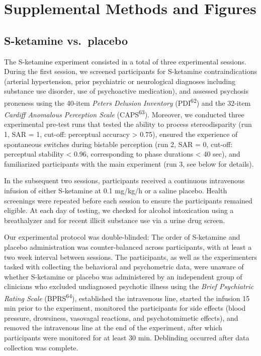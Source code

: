 \documentclass[
]{article}
\begin{document}
\section{Supplemental Methods and
Figures}\label{supplemental-methods-and-figures}

\subsection{S-ketamine vs.~placebo}\label{s-ketamine-vs.-placebo}

The S-ketamine experiment consisted in a total of three experimental
sessions. During the first session, we screened participants for
S-ketamine contraindications (arterial hypertension, prior psychiatric
or neurological diagnoses including substance use disorder, use of
psychoactive medication), and assessed psychosis proneness using the
40-item \emph{Peters Delusion Inventory} (PDI\textsuperscript{62}) and
the 32-item \emph{Cardiff Anomalous Perception Scale}
(CAPS\textsuperscript{63}). Moreover, we conducted three experimental
pre-test runs that tested the ability to process stereodisparity (run 1,
SAR = 1, cut-off: perceptual accuracy \textgreater{} 0.75), ensured the
experience of spontaneous switches during bistable perception (run 2,
SAR = 0, cut-off: perceptual stability \textless{} 0.96, corresponding
to phase durations \textless{} 40 sec), and familiarized participants
with the main experiment (run 3, see below for details).

In the subsequent two sessions, participants received a continuous
intravenous infusion of either S-ketamine at 0.1 mg/kg/h or a saline
placebo. Health screenings were repeated before each session to ensure
the participants remained eligible. At each day of testing, we checked
for alcohol intoxication using a breathalyzer and for recent illicit
substance use via a urine drug screen.

Our experimental protocol was double-blinded: The order of S-ketamine
and placebo administration was counter-balanced across participants,
with at least a two week interval between sessions. The participants, as
well as the experimenters tasked with collecting the behavioral and
psychometric data, were unaware of whether S-ketamine or placebo was
administered by an independent group of clinicians who excluded
undiagnosed psychotic illness using the \emph{Brief Psychiatric Rating
Scale} (BPRS\textsuperscript{64}), established the intravenous line,
started the infusion 15 min prior to the experiment, monitored the
participants for side effects (blood pressure, drowsiness, vasovagal
reactions, and psychotomimetic effects), and removed the intravenous
line at the end of the experiment, after which participants were
monitored for at least 30 min. Deblinding occurred after data collection
was complete.
\end{document}
